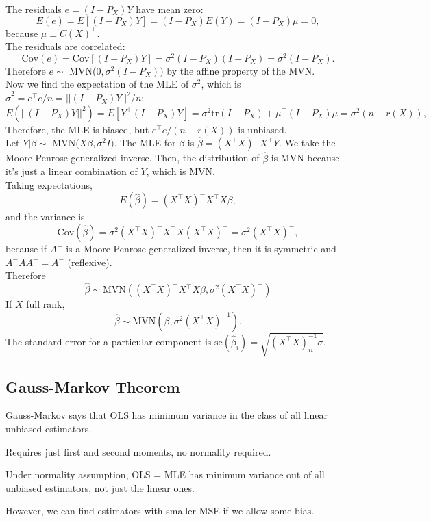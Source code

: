 \documentclass[letterpaper,11pt]{article}
\newenvironment{packed_item}{
\begin{itemize}
  \setlength{\itemsep}{1pt}
  \setlength{\parskip}{0pt}
  \setlength{\parsep}{0pt}
}{\end{itemize}}
\newcommand{\1}{\mathbf{1}} %
\begin{document}
The residuals $e = (I-P_X)Y$ have mean zero:
$$
E(e) = E[(I-P_X)Y] = (I - P_X) E(Y) = (I - P_X) \mu = 0,
$$
because $\mu \perp C(X)^\perp$. \\

The residuals are correlated:
$$
\mathrm{Cov}(e) = \mathrm{Cov}[(I-P_X)Y] = \sigma^2 (I-P_X)(I-P_X) = \sigma^2 (I - P_X).
$$
Therefore $e \sim $ MVN($0, \sigma^2(I-P_X))$ by the affine property
of the MVN. \\

Now we find the expectation of the MLE of $\sigma^2$, which is $\hat{\sigma}^2 = e^\intercal e /n = ||(I - P_X) Y||^2/n$:
$$
E(||(I - P_X) Y||^2) = E[ Y^\intercal (I-P_X) Y] = \sigma^2 \mathrm{tr}(I-P_X) + \mu^\intercal (I - P_X) \mu = \sigma^2(n-r(X)),
$$
Therefore, the MLE is biased, but $e^\intercal e/(n-r(X))$ is
unbiased. \\

Let $Y | \beta \sim$ MVN($X\beta, \sigma^2 I)$. The MLE for $\beta$ is $\hat{\beta} = (X^\intercal X)^{-} X^\intercal Y$. We take the Moore-Penrose generalized inverse. Then, the distribution of $\hat{\beta}$ is MVN because it's just a linear combination of $Y$, which is MVN. \\

Taking expectations,
$$
E(\hat{\beta}) = (X^\intercal X)^{-} X^\intercal X \beta,
$$
and the variance is
$$
\mathrm{Cov}(\hat{\beta}) = \sigma^2 (X^\intercal X)^{-} X^\intercal X (X^\intercal X)^{-} = \sigma^2 (X^\intercal X)^{-}, 
$$
because if $A^{-}$ is a Moore-Penrose generalized inverse, then it is symmetric and $A^{-} A A^{-} = A^{-}$ (reflexive).  \\

Therefore
$$
\hat{\beta} \sim \text{MVN}((X^\intercal X)^{-} X^\intercal X \beta, \sigma^2 (X^\intercal X)^{-})
$$
If $X$ full rank, 
$$
\hat{\beta} \sim \text{MVN}(\beta, \sigma^2 (X^\intercal X)^{-1}).
$$
The standard error for a particular component is
$\mathrm{se}(\hat{\beta}_i) = \sqrt{(X^\intercal X)^{-1}_{ii} \sigma
}$. \\


\subsection{Gauss-Markov Theorem}

\begin{packed_item}
\item Gauss-Markov says that OLS has minimum variance in the class of all linear unbiased estimators. 
\item Requires just first and second moments, no normality required.
\item Under normality assumption, OLS = MLE has minimum variance out of all unbiased estimators, not just the linear ones.
\item However, we can find estimators with smaller MSE if we allow some bias.
\end{packed_item}
 
\end{document}
